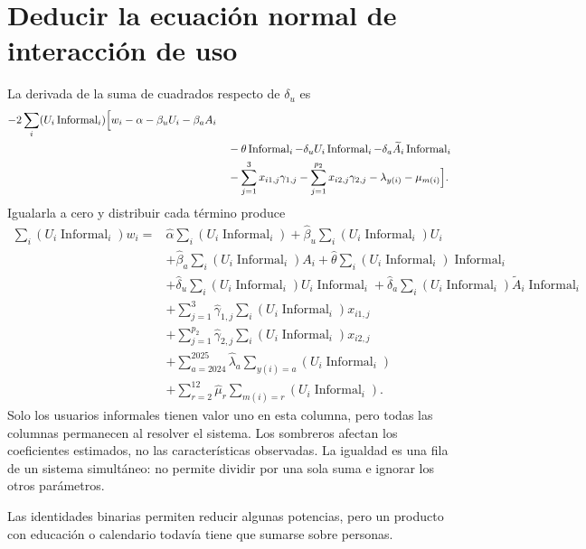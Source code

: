 \documentclass[11pt,a4paper]{article}
\begin{document}
\section{Deducir la ecuación normal de interacción de uso}
La derivada de la suma de cuadrados respecto de $\delta_u$ es
\[
\begin{aligned}-2\sum_i(U_i\operatorname{Informal}_i)\Bigl[w_i-\alpha-\beta_uU_i-\beta_aA_i\\&\quad-\theta\operatorname{Informal}_i-\delta_uU_i\operatorname{Informal}_i-\delta_a\widetilde A_i\operatorname{Informal}_i\\&\quad-\sum_{j=1}^3x_{i1,j}\gamma_{1,j}-\sum_{j=1}^{p_2}x_{i2,j}\gamma_{2,j}-\lambda_{y(i)}-\mu_{m(i)}\Bigr].\end{aligned}
\]
Igualarla a cero y distribuir cada término produce
\[
\begin{aligned}
\sum_i(U_i\operatorname{Informal}_i)w_i={}&\widehat\alpha\sum_i(U_i\operatorname{Informal}_i)
+\widehat\beta_u\sum_i(U_i\operatorname{Informal}_i)U_i\\
&+\widehat\beta_a\sum_i(U_i\operatorname{Informal}_i)A_i
+\widehat\theta\sum_i(U_i\operatorname{Informal}_i)\operatorname{Informal}_i\\
&+\widehat\delta_u\sum_i(U_i\operatorname{Informal}_i)U_i\operatorname{Informal}_i
+\widehat\delta_a\sum_i(U_i\operatorname{Informal}_i)\widetilde A_i\operatorname{Informal}_i\\
&+\sum_{j=1}^3\widehat\gamma_{1,j}\sum_i(U_i\operatorname{Informal}_i)x_{i1,j}\\
&+\sum_{j=1}^{p_2}\widehat\gamma_{2,j}\sum_i(U_i\operatorname{Informal}_i)x_{i2,j}\\
&+\sum_{a=2024}^{2025}\widehat\lambda_a\sum_{y(i)=a}(U_i\operatorname{Informal}_i)\\
&+\sum_{r=2}^{12}\widehat\mu_r\sum_{m(i)=r}(U_i\operatorname{Informal}_i).\end{aligned}
\]
Solo los usuarios informales tienen valor uno en esta columna, pero todas las columnas permanecen al resolver el sistema.
Los sombreros afectan los coeficientes estimados, no las características observadas. La igualdad es una fila de un sistema simultáneo: no permite dividir por una sola suma e ignorar los otros parámetros.

Las identidades binarias permiten reducir algunas potencias, pero un producto con educación o calendario todavía tiene que sumarse sobre personas.

\clearpage
\end{document}

